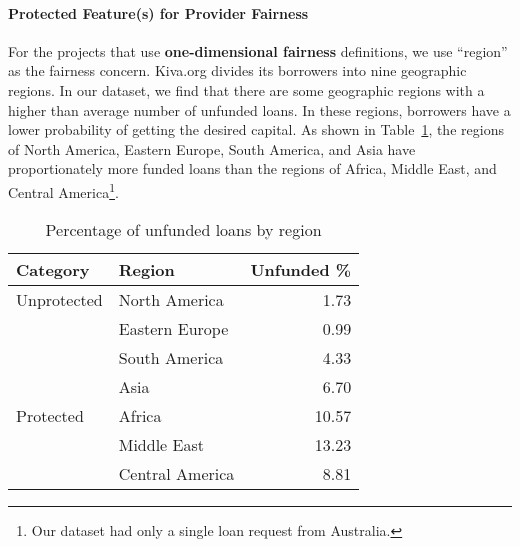 
        \vspace{0.25cm}
        \noindent \paragraph{Protected Feature(s) for Provider Fairness}
        \vspace{0.25cm}
        
            For the projects that use \textbf{one-dimensional fairness} definitions, we use ``region'' as the fairness concern. Kiva.org divides its borrowers into nine geographic regions. In our dataset, we find that there are some geographic regions with a higher than average number of unfunded loans. In these regions, borrowers have a lower probability of getting the desired capital. As shown in Table~\ref{tab:unfunded}, the regions of North America, Eastern Europe, South America, and Asia have proportionately more funded loans than the regions of Africa, Middle East, and Central America\footnote{Our dataset had only a single loan request from Australia.}. 
            
        
            \begin{table}
                \centering
            \begin{tabular}{l|l|r}
                Category & Region & Unfunded \% \\ \hline
                Unprotected & North America & 1.73 \\
                & Eastern Europe & 0.99 \\
                & South America & 4.33 \\
                & Asia & 6.70 \\ \hline
                Protected & Africa & 10.57 \\
                & Middle East & 13.23 \\
                & Central America & 8.81 \\
            \end{tabular}
                \caption{Percentage of unfunded loans by region}
                \label{tab:unfunded}
            \end{table}
     
